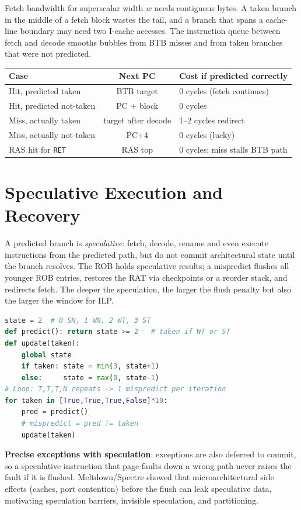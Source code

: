 Fetch bandwidth for superscalar width $w$ needs contiguous bytes. A taken branch in the middle of a fetch block wastes the tail, and a branch that spans a cache-line boundary may need two I-cache accesses. The instruction queue between fetch and decode smooths bubbles from BTB misses and from taken branches that were not predicted.

\begin{center}
\begin{tabular}{lcp{6.5cm}}
\toprule Case & Next PC & Cost if predicted correctly \\ \midrule
Hit, predicted taken & BTB target & 0 cycles (fetch continues) \\
Hit, predicted not-taken & PC + block & 0 cycles \\
Miss, actually taken & target after decode & 1--2 cycles redirect \\
Miss, actually not-taken & PC+4 & 0 cycles (lucky) \\
RAS hit for \texttt{RET} & RAS top & 0 cycles; miss stalls BTB path \\ \bottomrule
\end{tabular}
\end{center}

\section{Speculative Execution and Recovery}
A predicted branch is \textit{speculative}: fetch, decode, rename and even execute instructions from the predicted path, but do not commit architectural state until the branch resolves. The ROB holds speculative results; a mispredict flushes all younger ROB entries, restores the RAT via checkpoints or a reorder stack, and redirects fetch. The deeper the speculation, the larger the flush penalty but also the larger the window for ILP.

\begin{lstlisting}[language=Python, caption={2-bit predictor simulation (per branch)}, label={lst:bimodal}]
state = 2  # 0 SN, 1 WN, 2 WT, 3 ST
def predict(): return state >= 2   # taken if WT or ST
def update(taken):
    global state
    if taken: state = min(3, state+1)
    else:     state = max(0, state-1)
# Loop: T,T,T,N repeats -> 1 mispredict per iteration
for taken in [True,True,True,False]*10:
    pred = predict()
    # mispredict = pred != taken
    update(taken)
\end{lstlisting}

\textbf{Precise exceptions with speculation}: exceptions are also deferred to commit, so a speculative instruction that page-faults down a wrong path never raises the fault if it is flushed. Meltdown/Spectre showed that microarchitectural side effects (caches, port contention) before the flush can leak speculative data, motivating speculation barriers, invisible speculation, and partitioning.

